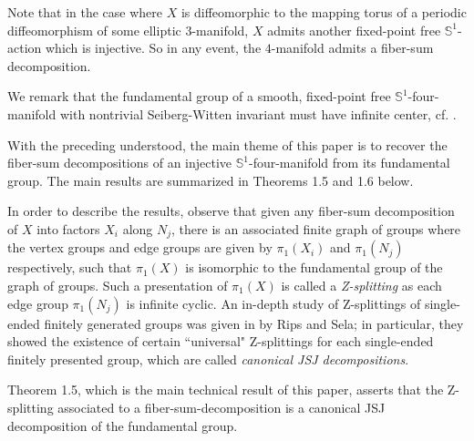 \documentclass[11pt]{amsart}
\theoremstyle{plain}
\numberwithin{theorem}{section}
\theoremstyle{definition}
\begin{document}
Note that in the case where $X$ is diffeomorphic to the mapping torus of a periodic diffeomorphism 
of some elliptic $3$-manifold, $X$ admits another fixed-point free ${{\mathbb S}}^1$-action which is injective.
So in any event, the $4$-manifold admits a fiber-sum decomposition. 

We remark that the fundamental group of a smooth, fixed-point free ${{\mathbb S}}^1$-four-manifold with 
nontrivial Seiberg-Witten invariant must have infinite center, cf. \cite{C1,C2}. 

\vspace{3mm}

With the preceding understood, the main theme of this paper is to recover the fiber-sum 
decompositions of an injective ${{\mathbb S}}^1$-four-manifold from its fundamental group. The main results 
are summarized in Theorems 1.5 and 1.6 below. 

In order to describe the results, observe
that given any fiber-sum decomposition of $X$ into factors $X_i$ along $N_j$, there is an
associated finite graph of groups where the vertex groups and edge groups are given by
$\pi_1(X_i)$ and $\pi_1(N_j)$ respectively, such that $\pi_1(X)$ is isomorphic to the 
fundamental group of the graph of groups. Such a presentation of $\pi_1(X)$ is
called a {\it Z-splitting} as each edge group $\pi_1(N_j)$ is infinite cyclic. An in-depth study of 
Z-splittings of single-ended finitely generated groups was given in \cite{RipS} by Rips and Sela; 
in particular, they showed the existence of certain ``universal" Z-splittings for each single-ended 
finitely presented group, which are called {\it canonical JSJ decompositions}.

Theorem 1.5, which is the main technical result of this paper, asserts that the Z-splitting
associated to a fiber-sum-decomposition is a canonical JSJ decomposition of the fundamental 
group. 
\end{document}
